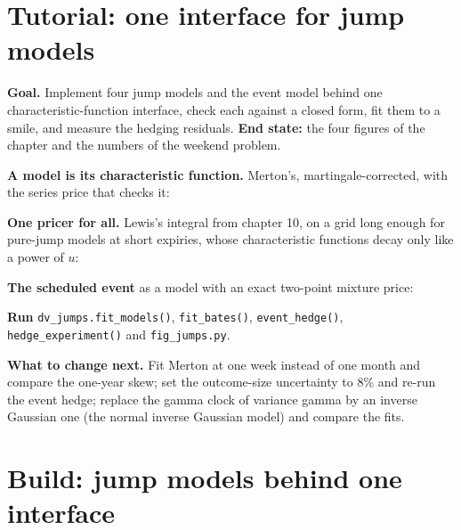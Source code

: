 \section{Tutorial: one interface for jump models}\label{tut:dv:jumps-and-levy-models:tut}

\begin{tutorial}
\textbf{Goal.} Implement four jump models and the event model behind one characteristic-function interface,
check each against a closed form, fit them to a smile, and measure the hedging residuals. \textbf{End state:} the
four figures of the chapter and the numbers of the weekend problem.
\begin{tutsteps}
\item \textbf{A model is its characteristic function.} Merton's, martingale-corrected, with the series price
that checks it:
\label{lst:dv:jumps-and-levy-models:merton}
\item \textbf{One pricer for all.} Lewis's integral from chapter 10, on a grid long enough for pure-jump models
at short expiries, whose characteristic functions decay only like a power of $u$:
\label{lst:dv:jumps-and-levy-models:lewis}
\item \textbf{The scheduled event} as a model with an exact two-point mixture price:
\label{lst:dv:jumps-and-levy-models:event}
\item \textbf{Run} \texttt{dv\_jumps.fit\_models()}, \texttt{fit\_bates()}, \texttt{event\_hedge()},
\texttt{hedge\_experiment()} and \texttt{fig\_jumps.py}.
\end{tutsteps}
\textbf{What to change next.} Fit Merton at one week instead of one month and compare the one-year skew; set the
outcome-size uncertainty to 8\% and re-run the event hedge; replace the gamma clock of variance gamma by an
inverse Gaussian one (the normal inverse Gaussian model) and compare the fits.
\end{tutorial}

\section{Build: jump models behind one interface}\label{bld:dv:jumps-and-levy-models:jumps}

